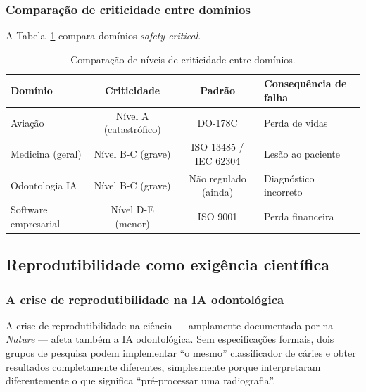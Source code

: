  

\subsubsection{Comparação de criticidade entre domínios}

A Tabela~\ref{tab:safety-comparison} compara domínios \textit{safety-critical}.

\begin{table}[H]
  \centering
  \caption{Comparação de níveis de criticidade entre domínios.}
  \label{tab:safety-comparison}
  \begin{tabularx}{\textwidth}{lccX}
    \toprule
    \textbf{Domínio} & \textbf{Criticidade} & \textbf{Padrão} & \textbf{Consequência de falha} \\
    \midrule
    Aviação & Nível A (catastrófico) & DO-178C & Perda de vidas \\
    Medicina (geral) & Nível B-C (grave) & ISO 13485 / IEC 62304 & Lesão ao paciente \\
    Odontologia IA & Nível B-C (grave) & Não regulado (ainda) & Diagnóstico incorreto \\
    Software empresarial & Nível D-E (menor) & ISO 9001 & Perda financeira \\
    \bottomrule
  \end{tabularx}
\end{table}


\subsection{Reprodutibilidade como exigência científica}

\subsubsection{A crise de reprodutibilidade na IA odontológica}

A crise de reprodutibilidade na ciência — amplamente documentada por
 na \textit{Nature} — afeta também
a IA odontológica. Sem especificações formais, dois grupos de pesquisa
podem implementar ``o mesmo'' classificador de cáries e obter resultados
completamente diferentes, simplesmente porque interpretaram diferentemente
o que significa ``pré-processar uma radiografia''.

